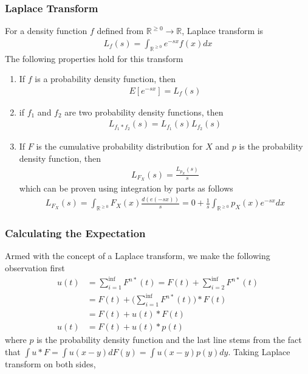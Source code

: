 \documentclass[../probability-notes.tex]{subfiles}
\begin{document}
    \subsubsection{Laplace Transform}
    For a density function $f$ defined from $\mathbb{R}^{\geq 0} \to \mathbb{R}$, Laplace transform is
    \begin{align*}
        L_{f}(s) = \int_{\mathbb{R}^{\geq 0}} e^{-sx} f(x) dx
    \end{align*}
    The following properties hold for this transform
    \begin{enumerate}
        \item If $f$ is a probability density function, then
        \begin{align*}
            E[e^{-sx}] = L_{f}(s)
        \end{align*}
        
        \item if $f_{1}$ and $f_{2}$ are two probability density functions, then
        \begin{align*}
            L_{f_{1}*f_{2}}(s) = L_{f_{1}}(s) L_{f_{2}}(s)
        \end{align*}
        
        \item \label{itm:laplace3} If $F$ is the cumulative probability distribution for $X$ and $p$ is the probability density function, then
        \begin{align*}
            L_{F_{X}}(s) = \frac{L_{p_{X}}(s)}{s}
        \end{align*}
        which can be proven using integration by parts as follows
        \begin{align*}
            L_{F_{X}}(s) = \int_{\mathbb{R}^{\geq 0}} F_{X}(x) \frac{d(e(-sx))}{s} = 0 + \frac{1}{s} \int_{\mathbb{R}^{\geq 0}} p_{X}(x) e^{-sx} dx
        \end{align*}
    \end{enumerate}

    \subsubsection{Calculating the Expectation}
    Armed with the concept of a Laplace transform, we make the following observation first
    \begin{align*}
        u(t) &= \sum_{i=1}^{\inf} F^{n*}(t) = F(t) + \sum_{i=2}^{\inf} F^{n*}(t)\\
        &= F(t) + \big( \sum_{i=1}^{\inf} F^{n*}(t) \big) * F(t)\\
        &= F(t) + u(t) * F(t)\\
       u(t) &= F(t) + u(t) * p(t)
    \end{align*}
    where $p$ is the probability density function and the last line stems from the fact that $\int u * F = \int u(x-y) dF(y) = \int u(x-y) p(y) dy$. Taking Laplace transform on both sides,
\end{document}
